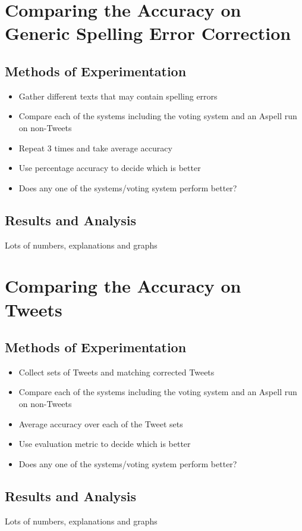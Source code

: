 \section{Comparing the Accuracy on Generic Spelling Error Correction}

\subsection{Methods of Experimentation}
\begin{itemize}
	\item Gather different texts that may contain spelling errors
	\item Compare each of the systems including the voting system and an Aspell run on non-Tweets
	\item Repeat 3 times and take average accuracy
	\item Use percentage accuracy to decide which is better
	\item Does any one of the systems/voting system perform better?
\end{itemize}

\subsection{Results and Analysis}
Lots of numbers, explanations and graphs

\section{Comparing the Accuracy on Tweets}
\subsection{Methods of Experimentation}
\begin{itemize}
	\item Collect sets of Tweets and matching corrected Tweets
	\item Compare each of the systems including the voting system and an Aspell run on non-Tweets
	\item Average accuracy over each of the Tweet sets
	\item Use evaluation metric to decide which is better
	\item Does any one of the systems/voting system perform better?
\end{itemize}

\subsection{Results and Analysis}
Lots of numbers, explanations and graphs

